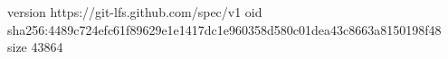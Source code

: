 version https://git-lfs.github.com/spec/v1
oid sha256:4489c724efc61f89629e1e1417dc1e960358d580c01dea43c8663a8150198f48
size 43864
